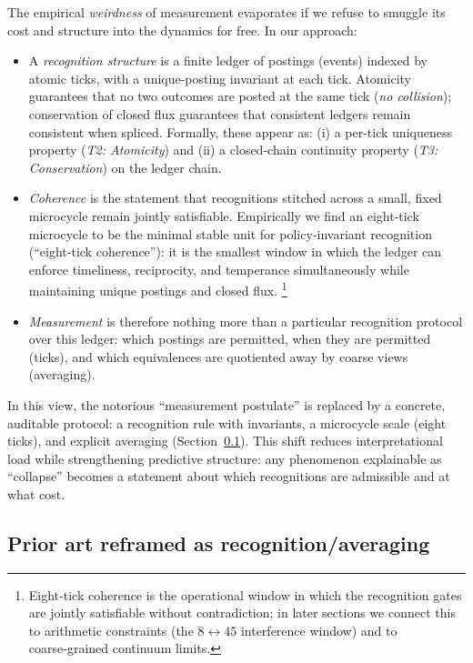\documentclass[12pt,a4paper]{article}
\theoremstyle{definition}
\theoremstyle{remark}
\begin{document}
The empirical \emph{weirdness} of measurement evaporates if we refuse to smuggle its cost and structure into the dynamics for free. In our approach:
\begin{itemize}
  \item A \emph{recognition structure} is a finite ledger of postings (events) indexed by atomic ticks, with a unique-posting invariant at each tick. Atomicity guarantees that no two outcomes are posted at the same tick (\emph{no collision}); conservation of closed flux guarantees that consistent ledgers remain consistent when spliced. Formally, these appear as: (i) a per-tick uniqueness property (\emph{T2: Atomicity}) and (ii) a closed-chain continuity property (\emph{T3: Conservation}) on the ledger chain.
  \item \emph{Coherence} is the statement that recognitions stitched across a small, fixed microcycle remain jointly satisfiable. Empirically we find an eight‑tick microcycle to be the minimal stable unit for policy‑invariant recognition (``eight‑tick coherence''): it is the smallest window in which the ledger can enforce timeliness, reciprocity, and temperance simultaneously while maintaining unique postings and closed flux.%
  \footnote{Eight‑tick coherence is the operational window in which the recognition gates are jointly satisfiable without contradiction; in later sections we connect this to arithmetic constraints (the $8 \leftrightarrow 45$ interference window) and to coarse‑grained continuum limits.}
  \item \emph{Measurement} is therefore nothing more than a particular recognition protocol over this ledger: which postings are permitted, when they are permitted (ticks), and which equivalences are quotiented away by coarse views (averaging).
\end{itemize}

In this view, the notorious ``measurement postulate'' is replaced by a concrete, auditable protocol: a recognition rule with invariants, a microcycle scale (eight ticks), and explicit averaging (Section~\ref{sec:prior-art-as-recognition}). This shift reduces interpretational load while strengthening predictive structure: any phenomenon explainable as ``collapse'' becomes a statement about which recognitions are admissible and at what cost.

\subsection{Prior art reframed as recognition/averaging}
\label{sec:prior-art-as-recognition}
\end{document}
